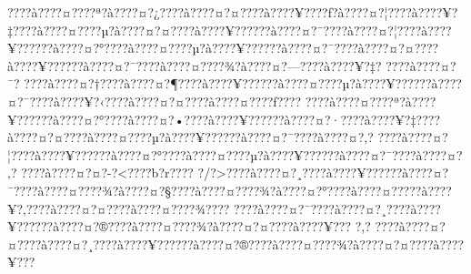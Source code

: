 \documentclass[11pt, openany]{book}
\begin{document}
???\textbar{}?à???\textbar{}?¤???\textbar{}?ª?à???\textbar{}?¤?¿???\textbar{}?à???\textbar{}?¤?¤???\textbar{}?à???\textbar{}?¥???\textbar{}?ƒ?à???\textbar{}?¤?¦???\textbar{}?à???\textbar{}?¥?‡???\textbar{}?à???\textbar{}?¤???\textbar{}?µ?à???\textbar{}?¤?¤???\textbar{}?à???\textbar{}?¥?????\textbar{}?à???\textbar{}?¤?¯???\textbar{}?à???\textbar{}?¤?¦???\textbar{}?à???\textbar{}?¥?????\textbar{}?à???\textbar{}?¤?°???\textbar{}?à???\textbar{}?¤???\textbar{}?µ?à???\textbar{}?¥?????\textbar{}?à???\textbar{}?¤?¯???\textbar{}?à???\textbar{}?¤?¤???\textbar{}?à???\textbar{}?¥?????\textbar{}?à???\textbar{}?¤?¯???\textbar{}?à???\textbar{}?¤???\textbar{}?¾?à???\textbar{}?¤?---???\textbar{}?à???\textbar{}?¥?‡?
???\textbar{}?à???\textbar{}?¤?¯?
???\textbar{}?à???\textbar{}?¤?†???\textbar{}?à???\textbar{}?¤?¶???\textbar{}?à???\textbar{}?¥?????\textbar{}?à???\textbar{}?¤???\textbar{}?µ?à???\textbar{}?¥?????\textbar{}?à???\textbar{}?¤?¯???\textbar{}?à???\textbar{}?¥?‹???\textbar{}?à???\textbar{}?¤?¤???\textbar{}?à???\textbar{}?¤???\textbar{}?ƒ???\textbar{}?
???\textbar{}?à???\textbar{}?¤???\textbar{}?ª?à???\textbar{}?¥?????\textbar{}?à???\textbar{}?¤?°???\textbar{}?à???\textbar{}?¤?•???\textbar{}?à???\textbar{}?¥?????\textbar{}?à???\textbar{}?¤?·???\textbar{}?à???\textbar{}?¥?‡???\textbar{}?à???\textbar{}?¤?¤???\textbar{}?à???\textbar{}?¤???\textbar{}?µ?à???\textbar{}?¥?????\textbar{}?à???\textbar{}?¤?¯???\textbar{}?à???\textbar{}?¤?‚?
???\textbar{}?à???\textbar{}?¤?¦???\textbar{}?à???\textbar{}?¥?????\textbar{}?à???\textbar{}?¤?°???\textbar{}?à???\textbar{}?¤???\textbar{}?µ?à???\textbar{}?¥?????\textbar{}?à???\textbar{}?¤?¯???\textbar{}?à???\textbar{}?¤?‚?
???\textbar{}?à???\textbar{}?¤?¤?-?\textless{}???\textbar{}?b?r???\textbar{}?
?/?\textgreater{}???\textbar{}?à???\textbar{}?¤?¸???\textbar{}?à???\textbar{}?¥?????\textbar{}?à???\textbar{}?¤?¯???\textbar{}?à???\textbar{}?¤???\textbar{}?¾?à???\textbar{}?¤?§???\textbar{}?à???\textbar{}?¤???\textbar{}?¾?à???\textbar{}?¤?°???\textbar{}?à???\textbar{}?¤?­???\textbar{}?à???\textbar{}?¥?‚???\textbar{}?à???\textbar{}?¤?¤???\textbar{}?à???\textbar{}?¤???\textbar{}?¾???\textbar{}?
???\textbar{}?à???\textbar{}?¤?¯???\textbar{}?à???\textbar{}?¤?¸???\textbar{}?à???\textbar{}?¥?????\textbar{}?à???\textbar{}?¤?®???\textbar{}?à???\textbar{}?¤???\textbar{}?¾?à???\textbar{}?¤?¤???\textbar{}?à???\textbar{}?¥???
?,?
???\textbar{}?à???\textbar{}?¤?¤???\textbar{}?à???\textbar{}?¤?¸???\textbar{}?à???\textbar{}?¥?????\textbar{}?à???\textbar{}?¤?®???\textbar{}?à???\textbar{}?¤???\textbar{}?¾?à???\textbar{}?¤?¤???\textbar{}?à???\textbar{}?¥???
\end{document}
